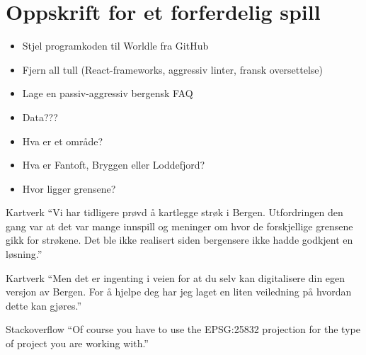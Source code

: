 \section{Oppskrift for et forferdelig spill}
\begin{frame}
    \begin{itemize}[<+->]
        \item Stjel programkoden til Worldle fra GitHub
        \item Fjern all tull (React-frameworks, aggressiv linter, fransk oversettelse)
        \item Lage en passiv-aggressiv bergensk FAQ
        \item Data???
        \item Hva er et område?
        \item Hva er Fantoft, Bryggen eller Loddefjord?
        \item Hvor ligger grensene?
    \end{itemize}
\end{frame}

\begin{frame}
    \begin{block}{Kartverk}
        \enquote{Vi har tidligere prøvd å kartlegge strøk i Bergen. Utfordringen den gang var at det var mange innspill og meninger om hvor de forskjellige grensene gikk for strøkene. Det ble ikke realisert siden bergensere ikke hadde godkjent en løsning.}
    \end{block}
    \pause
    \begin{block}{Kartverk}
        \enquote{Men det er ingenting i veien for at du selv kan digitalisere din egen versjon av Bergen. For å hjelpe deg har jeg laget en liten veiledning på hvordan dette kan gjøres.}
    \end{block}
    \pause
    \begin{block}{Stackoverflow}
        \enquote{Of course you have to use the EPSG:25832 projection for the type of project you are working with.}
    \end{block}
\end{frame}